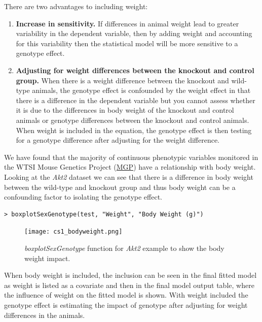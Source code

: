 \documentclass[12pt,a4paper]{article}
\begin{document}
There are two advantages to including weight:
\begin{enumerate}
 \item \textbf{Increase in sensitivity.}  
If differences in animal weight lead to greater variability in the dependent variable, then by adding weight and accounting for this variability then the statistical model will be more sensitive to a genotype effect. 

 \item \textbf{Adjusting for weight differences between the knockout and control group.}  
When there is a weight difference between the knockout and wild-type animals, the genotype effect is confounded by the weight effect in that there is a difference in the dependent variable but you cannot assess whether it is due to the differences in body weight of the knockout and control animals or genotype differences between the knockout and control animals. When weight is included in the equation, the genotype effect is then testing for a genotype difference after adjusting for the weight difference.

\end{enumerate}

We have found that the majority of continuous phenotypic variables monitored in the WTSI Mouse Genetics Project (\href{http://www.sanger.ac.uk/resources/mouse/}{MGP}) have a relationship with body weight. 
Looking at the \textit{Akt2} dataset we can see that there is a difference in body weight between the wild-type and knockout group and thus body weight can be a confounding factor to isolating the genotype effect.   

\begingroup
    \fontsize{8pt}{12pt}\selectfont
\begin{verbatim}
> boxplotSexGenotype(test, "Weight", "Body Weight (g)")
\end{verbatim}
\endgroup 

\begin{figure}[H]%
\centerline{\texttt{[image: cs1\_bodyweight.png]}}
\caption{\textit{boxplotSexGenotype} function for \textit{Akt2} example to show the body weight impact.}\label{fig:22}
\end{figure}

When body weight is included, the inclusion can be seen in the final fitted model as weight is listed as a covariate and then in the final model output table, where the influence of weight on the fitted model is shown.  
With weight included the genotype effect is estimating the impact of genotype after adjusting for weight differences in the animals. 
\end{document}
